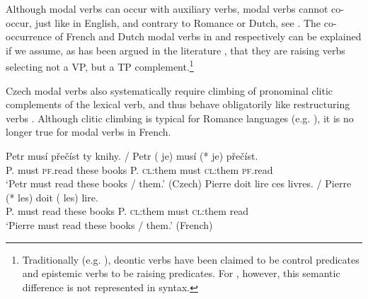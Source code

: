 \documentclass[output=paper,colorlinks,citecolor=brown,
modfonts
]{langscibook}
\begin{document}
\noindent Although modal verbs can occur with auxiliary verbs, modal verbs cannot co-occur, just like in English, and contrary to Romance or Dutch, see . The co-occurrence of French and Dutch modal verbs in  and  respectively can be explained if we assume, as has been argued in the literature \citep{Ruwet1972,Wurmbrand1999,Wurmbrand2001}, that they are raising verbs selecting not a VP, but a TP complement.\footnote{Traditionally (e.g. \citealt{Ross1969a}), deontic verbs have been claimed to be control predicates and epistemic verbs to be raising predicates. For \cite{Wurmbrand1999}, however, this semantic difference is not represented in syntax.}

\ea\label{15} 
\z\z

\noindent Czech modal verbs also systematically require climbing of pronominal clitic complements of the lexical verb, and thus behave obligatorily like restructuring verbs \citep{Medová2000}. Although clitic climbing is typical for Romance languages (e.g. \citealt{Rizzi1978,Roberts1991}), it is no longer true for modal verbs in French. 

\begin{exe}
\ex \label{16} 
\begin{xlist}
\ex\label{16a}
\gll Petr musí přečíst  ty  knihy.  / Petr (\hspace{-2pt} je) musí (*\hspace{-2pt} je)   přečíst. \\
P.    must \textsc{pf}.read these books   {} P.  {} \textsc{cl}:them must {} \textsc{cl}:them \textsc{pf}.read\\
\glt   `Petr must read these books / them.' \hfill (Czech)
\ex \label{16b}
\gll  Pierre doit  lire   ces livres.  /  Pierre (*\hspace{-2pt} les)  doit  (\hspace{-2pt} les)  lire.\\
P.  must read these books  {} P.   {} \textsc{cl}:them must {} \textsc{cl}:them read\\
\glt `Pierre must read these books / them.' \hfill (French)
\end{xlist}
\end{exe}
\end{document}

